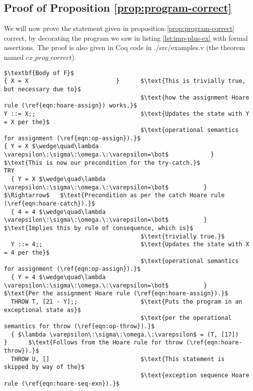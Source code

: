 \subsection{Proof of Proposition \ref{prop:program-correct}}

We will now prove the statement given in proposition \ref{prop:program-correct} correct, by decorating the program we saw in listing \ref{lst:imp-plus-ex} with formal assertions. The proof is also given in Coq code in ./src/examples.v (the theorem named $cx\_prog\_correct$).

\begin{lstlisting}[mathescape=true,keepspaces=true,label=lst:hoare_ex_asgn,caption=Decorated variant of the program from listing \ref{lst:imp-plus-ex}.]
$\textbf{Body of F}$
{ X = X                         }      $\text{This is trivially true, but necessary due to}$
                                       $\text{how the assignment Hoare rule (\ref{eqn:hoare-assign}) works.}$
Y ::= X;;                              $\text{Updates the state with Y = X per the}$
                                       $\text{operational semantics for assignment (\ref{eqn:op-assign}).}$
{ Y = X $\wedge\quad\lambda \varepsilon\:\sigma\:\omega.\:\varepsilon=\bot$            }      $\text{This is now our precondition for the try-catch.}$
TRY
  { Y = X $\wedge\quad\lambda \varepsilon\:\sigma\:\omega.\:\varepsilon=\bot$          } $\Rightarrow$   $\text{Precondition as per the catch Hoare rule (\ref{eqn:hoare-catch}).}$
  { 4 = 4 $\wedge\quad\lambda \varepsilon\:\sigma\:\omega.\:\varepsilon=\bot$          }      $\text{Implies this by rule of consequence, which is}$
                                       $\text{trivially true.}$
  Y ::= 4;;                            $\text{Updates the state with X = 4 per the}$
                                       $\text{operational semantics for assignment (\ref{eqn:op-assign}).}$
  { Y = 4 $\wedge\quad\lambda \varepsilon\:\sigma\:\omega.\:\varepsilon=\bot$          }      $\text{Per the assignment Hoare rule (\ref{eqn:hoare-assign}).}$
  THROW T, [21 - Y];;                  $\text{Puts the program in an exceptional state as}$
                                       $\text{per the operational semantics for throw (\ref{eqn:op-throw}).}$
  { $\lambda \varepsilon\:\sigma\:\omega.\:\varepsilon$ = (T, [17])          }      $\text{Follows from the Hoare rule for throw (\ref{eqn:hoare-throw}).}$
  THROW U, []                          $\text{This statement is skipped by way of the}$
                                       $\text{exception sequence Hoare rule (\ref{eqn:hoare-seq-exn}).}$

\end{lstlisting}
